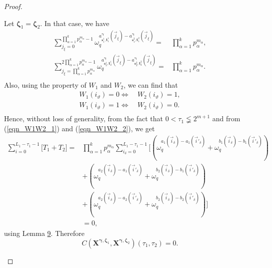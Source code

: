 \documentclass[10pt,a4paper]{amsart}
\theoremstyle{plain}
\begin{document}
\begin{proof}
\begin{mycases}
			\begin{mysubcases}
				\item Let $\bm{\zeta}_1 = \bm{\zeta}_2$. In that case, we have
				\begin{equation}
					\begin{split}
						\sum_{j_{\xi}=0}^{\prod_{\alpha=1}^{k} p_\alpha^{m_\alpha} -1} \omega_q^{a_{\mathbf{s}_1^1,\mathbf{t}_1^1}^{\bm{\gamma}} (\vec{j}_{\xi})-a_{\mathbf{s}_1^2,\mathbf{t}_1^2}^{\bm{\gamma}} (\vec{j}_{\xi}) }=& \prod_{\alpha=1}^{k} p_\alpha^{m_\alpha},\\
						\sum_{j_{\xi}= \prod_{\alpha=1}^{k} p_\alpha^{m_\alpha}}^{2 \prod_{\alpha=1}^{k} p_\alpha^{m_\alpha} -1} \omega_q^{a_{\mathbf{s}_2^1,\mathbf{t}_2^1}^{\bm{\gamma}} (\vec{j}_{\xi})-a_{\mathbf{s}_2^2,\mathbf{t}_2^2}^{\bm{\gamma}} (\vec{j}_{\xi}) }=& \prod_{\alpha=1}^{k} p_\alpha^{m_\alpha}.\\
					\end{split}
				\end{equation}
				Also, using the property of $W_1$ and $W_2$, we can find that
				\begin{equation}
					\begin{split}
						W_1(i_\vartheta)=0  \Leftrightarrow  &~ W_2(i_\vartheta)=1,\\
						W_1(i_\vartheta)=1 \Leftrightarrow  &~ W_2(i_\vartheta)=0.\\
					\end{split}
				\end{equation}
				Hence, without loss of generality, from the fact that $0< \tau_1 \lneqq 2^{m+1}$ and from (\ref{eqn_W1W2_1}) and (\ref{eqn_W1W2_2}), we get
				\begin{equation}
					\begin{split}
						\sum_{i=0}^{L_1 -\tau_1-1} \bigg[ T_1 + T_2 \bigg]
						=&\prod_{\alpha=1}^{k} p_\alpha^{m_\alpha} \sum_{i_{\delta}=0}^{L_1 -\tau_1-1} \bigg[ \left( \omega_q^{ a_1 (\vec{i}_{\delta})- a_1 (\vec{i}'_{\delta})} + \omega_q^{ b_1 (\vec{i}_{\delta})- b_1 (\vec{i}'_{\delta})}  \right)\\
						& + \left( \omega_q^{ a_2 (\vec{i}_{\delta})- a_1 (\vec{i}'_{\delta})} + \omega_q^{ b_2 (\vec{i}_{\delta})- b_1 (\vec{i}'_{\delta})}  \right)\\ &+\left( \omega_q^{ a_2 (\vec{i}_{\delta})- a_2 (\vec{i}'_{\delta})} + \omega_q^{ b_2 (\vec{i}_{\delta})- b_2 (\vec{i}'_{\delta})}  \right)   \bigg]\\
						&=0,
					\end{split}
				\end{equation}
				using Lemma \href{https://arxiv.org/abs/2109.00970v4}{9}. Therefore
				\begin{equation}
					C\left( \mathbf{X}^{\bm{\gamma},\bm{\zeta}_1}, \mathbf{X}^{\bm{\gamma}, \bm{\zeta}_2} \right) (\tau_1, \tau_2)=0.
				\end{equation}
				

\end{mysubcases}
\end{mycases}
\end{proof}
\end{document}
